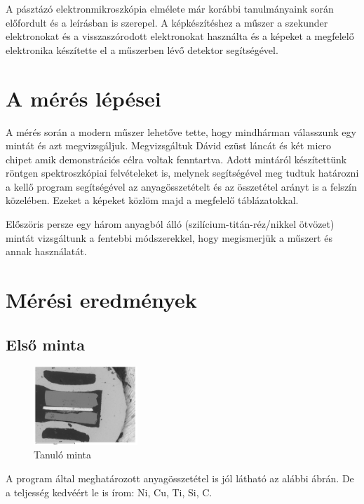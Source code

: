 \documentclass[a4paper,12pt]{article}
\begin{document}
\par A pásztázó elektronmikroszkópia elmélete már korábbi tanulmányaink során előfordult és a leírásban
is szerepel. A képkészítéshez a műszer a szekunder elektronokat és a visszaszórodott elektronokat használta
és a képeket a megfelelő elektronika készítette el a műszerben lévő detektor segítségével.

\section{ A mérés lépései}

\par A mérés során a modern műszer lehetőve tette, hogy mindhárman válasszunk egy mintát és azt megvizsgáljuk.
Megvizsgáltuk Dávid ezüst láncát és két micro chipet amik demonstrációs célra voltak fenntartva. Adott mintáról
készítettünk röntgen spektroszkópiai felvételeket is, melynek segítségével meg tudtuk határozni a kellő program
segítségével az anyagösszetételt és az összetétel arányt is a felszín közelében. Ezeket a képeket közlöm majd a
megfelelő táblázatokkal.

\par Előszöris persze egy három anyagból álló (szilícium-titán-réz/nikkel ötvözet) mintát vizsgáltunk a fentebbi
módszerekkel, hogy megismerjük a műszert és annak használatát.

\section{ Mérési eredmények}

\subsection{ Első minta}

\begin{figure}[H]
	\centering
	\includegraphics[width=0.35\textwidth, height=0.25\textwidth]{Jcsop/elso.png}
	\caption{Tanuló minta}
\end{figure}

\par A program által meghatározott anyagösszetétel is jól látható az alábbi ábrán. De a teljesség kedvéért
le is írom: Ni, Cu, Ti, Si, C.
\end{document}
